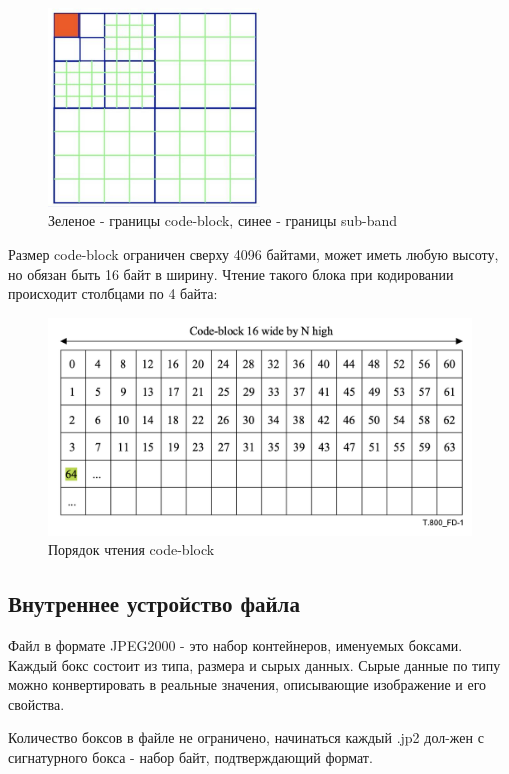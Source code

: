 \documentclass[a4paper]{article}
\begin{document}
  \begin{figure}[H]
    \centering
    \includegraphics[width=0.5\textwidth]{div.png}
    \caption{Зеленое - границы code-block, синее - границы sub-band}
  \end{figure}

  Размер code-block ограничен сверху 4096 байтами, может иметь любую высоту,
  но обязан быть 16 байт в ширину. Чтение такого блока при кодировании
  происходит столбцами по 4 байта:

  \begin{figure}[H]
    \centering
    \includegraphics[width=\textwidth]{cb}
    \caption{Порядок чтения code-block}
  \end{figure}

  \subsection{Внутреннее устройство файла}

  Файл в формате JPEG2000 - это набор контейнеров, именуемых боксами. Каждый бокс
  состоит из типа, размера и сырых данных. Сырые данные по типу можно конвертировать
  в реальные значения, описывающие изображение и его свойства.

  Количество боксов в файле не ограничено, начинаться каждый .jp2 дол-жен
  с сигнатурного бокса - набор байт, подтверждающий формат.
\end{document}
